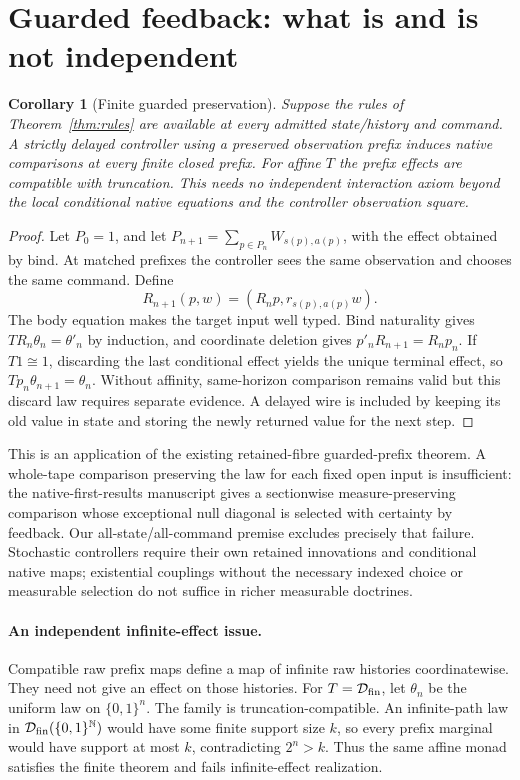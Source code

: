 \documentclass[11pt]{article}
\newtheorem{corollary}[theorem]{Corollary}
\begin{document}
\section{Guarded feedback: what is and is not independent}

\begin{corollary}[Finite guarded preservation]\label{cor:feedback}
Suppose the rules of Theorem~\ref{thm:rules} are available at every admitted state/history and command. A strictly delayed controller using a preserved observation prefix induces native comparisons at every finite closed prefix. For affine $T$ the prefix effects are compatible with truncation. This needs no independent interaction axiom beyond the local conditional native equations and the controller observation square.
\end{corollary}
\begin{proof}
Let $P_0=1$, and let $P_{n+1}=\sum_{p\in P_n}W_{s(p),a(p)}$, with the effect obtained by bind. At matched prefixes the controller sees the same observation and chooses the same command. Define
\[
 R_{n+1}(p,w)=(R_np,r_{s(p),a(p)}w).
\]
The body equation makes the target input well typed. Bind naturality gives $TR_n\theta_n=\theta'_n$ by induction, and coordinate deletion gives $p'_nR_{n+1}=R_np_n$. If $T1\cong1$, discarding the last conditional effect yields the unique terminal effect, so $Tp_n\theta_{n+1}=\theta_n$. Without affinity, same-horizon comparison remains valid but this discard law requires separate evidence. A delayed wire is included by keeping its old value in state and storing the newly returned value for the next step.
\end{proof}

This is an application of the existing retained-fibre guarded-prefix theorem. A whole-tape comparison preserving the law for each fixed open input is insufficient: the native-first-results manuscript gives a sectionwise measure-preserving comparison whose exceptional null diagonal is selected with certainty by feedback. Our all-state/all-command premise excludes precisely that failure. Stochastic controllers require their own retained innovations and conditional native maps; existential couplings without the necessary indexed choice or measurable selection do not suffice in richer measurable doctrines.

\paragraph{An independent infinite-effect issue.} Compatible raw prefix maps define a map of infinite raw histories coordinatewise. They need not give an effect on those histories. For $T=\mathcal D_{\rm fin}$, let $\theta_n$ be the uniform law on $\{0,1\}^n$. The family is truncation-compatible. An infinite-path law in $\mathcal D_{\rm fin}(\{0,1\}^{\mathbb N})$ would have some finite support size $k$, so every prefix marginal would have support at most $k$, contradicting $2^n>k$. Thus the same affine monad satisfies the finite theorem and fails infinite-effect realization.
\end{document}
